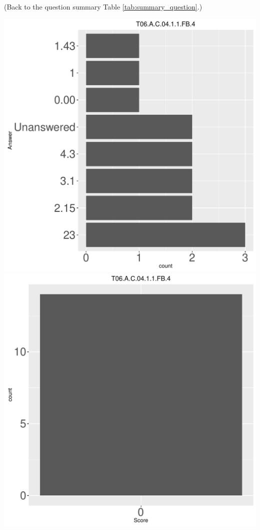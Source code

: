\documentclass[12pt,english,nohyper]{tufte-handout}\usepackage[]{graphicx}\usepackage[]{color}
\begin{document}
 (Back to the question summary Table \ref{tab:summary_question}.)

\begin{center} \includegraphics[width=.45\linewidth]{Topic06_AB_12_answer} \includegraphics[width=.45\linewidth]{Topic06_AB_12_score} \end{center} 
\end{document}
